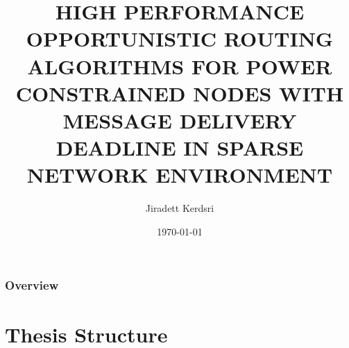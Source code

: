 \documentclass{beamer}
\title[Thesis]{HIGH PERFORMANCE OPPORTUNISTIC ROUTING ALGORITHMS FOR POWER CONSTRAINED NODES WITH MESSAGE DELIVERY DEADLINE IN SPARSE NETWORK ENVIRONMENT} %
\author{Jiradett Kerdsri} %
\institute[SIIT] %
{
Sirindhorn International Institute of Technology,
Thammasat University \\ %
\medskip
\textit{jiradett.k@dti.or.th} %
}
\date{\today} %
\begin{document}
\begin{frame}
\titlepage %
\end{frame}

\begin{frame}
\frametitle{Overview} %
\tableofcontents %
\end{frame}


\section{Thesis Structure} %

\end{document}
